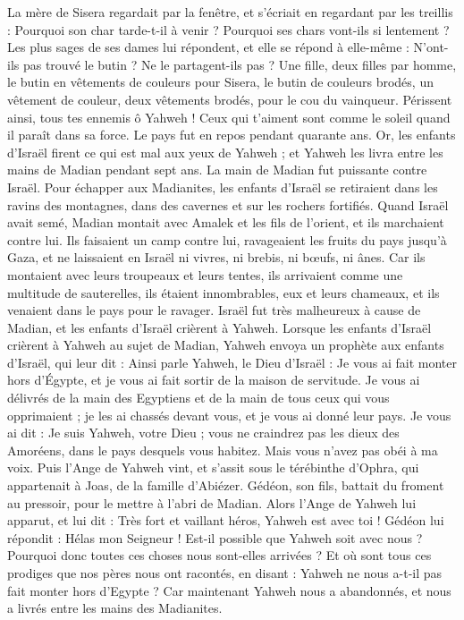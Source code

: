 \begin{multicols}{2}
La mère de Sisera regardait par la fenêtre, et s'écriait en regardant par les treillis : Pourquoi son char tarde-t-il à venir ? Pourquoi ses chars vont-ils si lentement ?
Les plus sages de ses dames lui répondent, et elle se répond à elle-même :
N'ont-ils pas trouvé  le butin ? Ne le partagent-ils pas ? Une fille, deux filles par homme, le butin en vêtements de couleurs pour Sisera, le butin de couleurs brodés, un vêtement de couleur, deux vêtements brodés, pour le cou du vainqueur.
Périssent ainsi, tous tes ennemis ô Yahweh ! Ceux qui t'aiment sont comme le soleil quand il paraît dans sa force. Le pays fut en repos pendant quarante ans.
\VerseOne{}Or, les enfants d'Israël firent ce qui est mal aux yeux de  Yahweh ; et Yahweh les livra entre les mains de Madian pendant sept ans.
La main de Madian fut puissante contre Israël. Pour échapper aux Madianites, les enfants d'Israël se retiraient dans les ravins des montagnes, dans des cavernes et sur les rochers fortifiés.
Quand Israël avait semé, Madian montait avec Amalek et les fils de l’orient, et ils marchaient contre lui.
Ils faisaient un camp contre lui, ravageaient les fruits du pays jusqu'à Gaza, et ne laissaient en Israël ni vivres, ni brebis, ni bœufs, ni ânes.
Car ils montaient avec leurs troupeaux et leurs tentes, ils arrivaient comme une multitude de sauterelles, ils étaient innombrables, eux et leurs chameaux, et ils venaient dans le pays pour le ravager.
Israël fut très malheureux à cause de Madian, et les enfants d'Israël crièrent à Yahweh.
Lorsque les enfants d'Israël crièrent à Yahweh au sujet de Madian,
Yahweh envoya un prophète aux enfants d'Israël, qui leur dit : Ainsi parle Yahweh, le Dieu d'Israël : Je vous ai fait monter hors d’Égypte, et je vous ai fait sortir de la maison de servitude.
Je vous ai délivrés de la main des Egyptiens et de la main de tous ceux qui vous opprimaient ; je les ai chassés devant vous, et je vous ai donné leur pays.
Je vous ai dit : Je suis Yahweh, votre Dieu ; vous ne craindrez pas les dieux des Amoréens, dans le pays desquels vous habitez. Mais vous n'avez pas obéi à ma voix.
Puis l'Ange de Yahweh vint, et s'assit sous le térébinthe d’Ophra, qui appartenait à Joas, de la famille d'Abiézer. Gédéon, son fils, battait du froment au pressoir, pour le mettre à l'abri de Madian.
Alors l'Ange de Yahweh lui apparut, et lui dit : Très fort et vaillant héros, Yahweh est avec toi !
Gédéon lui répondit : Hélas mon Seigneur ! Est-il possible que Yahweh soit avec nous ? Pourquoi donc toutes ces choses nous sont-elles arrivées ? Et où sont tous ces prodiges que nos pères nous ont racontés, en disant : Yahweh ne nous a-t-il pas fait monter hors d'Egypte ? Car maintenant Yahweh nous a abandonnés, et nous a livrés entre les mains des Madianites.

\end{multicols}
